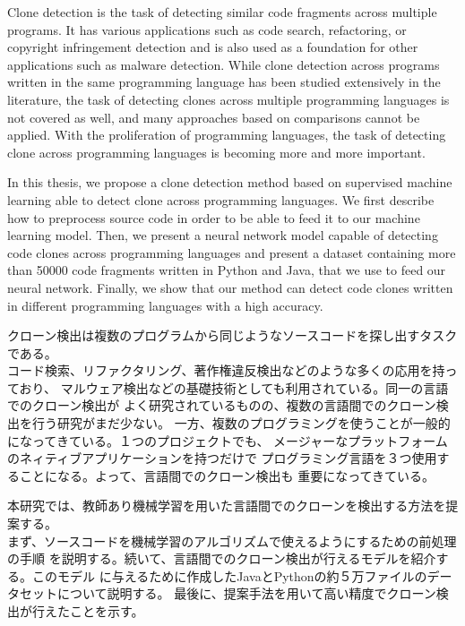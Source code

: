 \begin{eabstract}
Clone detection is the task of detecting similar code fragments across
multiple programs. It has various applications such as code search,
refactoring, or copyright infringement detection and is also used as a
foundation for other applications such as malware detection. While clone
detection across programs written in the same programming language has been
studied extensively in the literature, the task of detecting clones across
multiple programming languages is not covered as well, and many approaches
based on comparisons cannot be applied. With the proliferation
of programming languages, the task of detecting clone across programming
languages is becoming more and more important.

In this thesis, we propose a clone detection method based on supervised
machine learning able to detect clone across programming languages. We first
describe how to preprocess source code in order to be able to feed it to our
machine learning model. Then, we present a neural network model capable of
detecting code clones across programming languages and present a dataset
containing more than 50000 code fragments written in Python and Java,
that we use to feed our neural network. Finally, we show that our method can
detect code clones written in different programming languages with a high
accuracy.
\end{eabstract}

\begin{jabstract}
クローン検出は複数のプログラムから同じようなソースコードを探し出すタスクである。\\
コード検索、リファクタリング、著作権違反検出などのような多くの応用を持っており、%
マルウェア検出などの基礎技術としても利用されている。同一の言語でのクローン検出が%
よく研究されているものの、複数の言語間でのクローン検出を行う研究がまだ少ない。%
一方、複数のプログラミングを使うことが一般的になってきている。１つのプロジェクトでも、%
メージャーなプラットフォームのネィティブアプリケーションを持つだけで%
プログラミング言語を３つ使用することになる。よって、言語間でのクローン検出も%
重要になってきている。

本研究では、教師あり機械学習を用いた言語間でのクローンを検出する方法を提案する。\\
まず、ソースコードを機械学習のアルゴリズムで使えるようにするための前処理の手順%
を説明する。続いて、言語間でのクローン検出が行えるモデルを紹介する。このモデル%
に与えるために作成したJavaとPythonの約５万ファイルのデータセットについて説明する。%
最後に、提案手法を用いて高い精度でクローン検出が行えたことを示す。
\end{jabstract}
